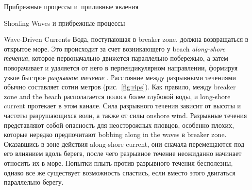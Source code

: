 \begin{chapter}{Прибрежные процессы и~приливные явления}
\begin{section}{Shoaling Waves и прибрежные процессы}
\begin{paragraph}{Wave-Driven Currents}
Вода, поступающая в breaker zone, 
должна возвращаться в открытое море. Это происходит за счет возникающего 
у beach \emph{along-shore течения}, 
которое первоначально движется параллельно побережью, а затем поворачивает 
и удаляется от него в перпендикулярном направлении,
формируя узкое быстрое \emph{разрывное течение}%
. 
Расстояние между разрывными течениями обычно составляет сотни метров
(рис.~\ref{fig:rips}). Как правило, между breaker zone and the beach
располагается полоса более глубокой воды, и long-shore current 
протекает в этом канале. Сила разрывного течения 
зависит от высоты и частоты разрушающихся волн, а также от силы
onshore wind. Разрывные течения представляют собой опасность для неосторожных
пловцов, особенно плохих, которые нередко предпочитают 
bobbing along in the waves в breaker zone. 
Оказавшись в зоне действия along-shore current, они сначала перемещаются
под его влиянием вдоль берега, после чего разрывное течение неожиданно  
начинает относить их в море. Попытки плыть против разрывного течения 
бесполезны, однако все же существует возможность спастись, если вместо
этого двигаться параллельно берегу.
%


\end{paragraph}
\end{section}
\end{chapter}
